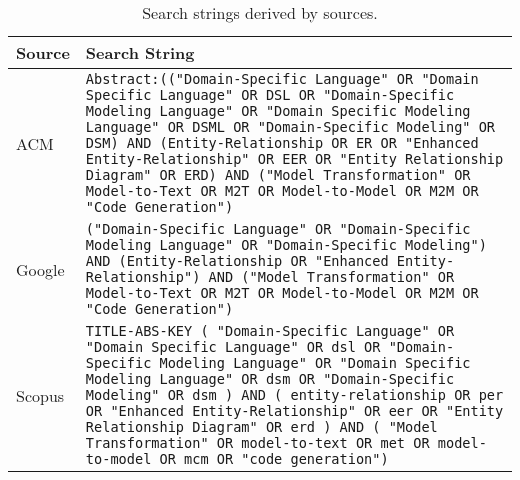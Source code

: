 \begin{table}[!htb]
\caption{Search strings derived by sources.}
\label{tab:StringsDatabases}
\tiny
\begin{tabular}{m{1.0cm}m{14.0cm}}
\bottomrule
\textbf{Source} & \textbf{Search String} \\
\midrule
\T ACM & \texttt{Abstract:(("Domain-Specific Language" OR "Domain Specific Language" OR DSL OR "Domain-Specific Modeling Language" OR "Domain Specific Modeling Language" OR DSML OR "Domain-Specific Modeling" OR DSM) \linebreak AND \linebreak (Entity-Relationship OR ER OR "Enhanced Entity-Relationship" OR EER OR "Entity Relationship Diagram" OR ERD) \linebreak AND \linebreak ("Model Transformation" OR Model-to-Text OR M2T OR Model-to-Model OR M2M OR "Code Generation")} \\
\midrule
\T Google & \texttt{("Domain-Specific Language" OR "Domain-Specific Modeling Language" OR "Domain-Specific Modeling") \linebreak AND \linebreak (Entity-Relationship OR "Enhanced Entity-Relationship") \linebreak AND \linebreak ("Model Transformation" OR Model-to-Text OR M2T OR Model-to-Model OR M2M OR "Code Generation")} \\
\midrule
\T Scopus & \texttt{TITLE-ABS-KEY ( "Domain-Specific Language"  OR  "Domain Specific Language"  OR  dsl  OR  "Domain-Specific Modeling Language"  OR  "Domain Specific Modeling Language"  OR  dsm  OR  "Domain-Specific Modeling"  OR  dsm )  \linebreak AND \linebreak ( entity-relationship  OR  per  OR  "Enhanced Entity-Relationship"  OR  eer  OR  "Entity Relationship Diagram"  OR  erd ) \linebreak AND \linebreak ( "Model Transformation"  OR  model-to-text  OR  met  OR  model-to-model  OR  mcm  OR  "code generation")} \\
\midrule

\end{tabular}
\end{table}
